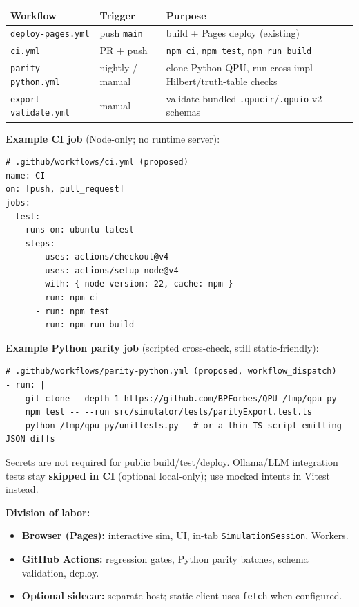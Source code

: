 \documentclass[11pt,a4paper]{article}
\begin{document}
\begin{center}
\begin{tabular}{@{}lll@{}}
\toprule
Workflow & Trigger & Purpose \\
\midrule
\texttt{deploy-pages.yml} & push \texttt{main} & build + Pages deploy (existing) \\
\texttt{ci.yml} & PR + push & \texttt{npm ci}, \texttt{npm test}, \texttt{npm run build} \\
\texttt{parity-python.yml} & nightly / manual & clone Python QPU, run cross-impl Hilbert/truth-table checks \\
\texttt{export-validate.yml} & manual & validate bundled \texttt{.qpucir}/\texttt{.qpuio} v2 schemas \\
\bottomrule
\end{tabular}
\end{center}

\textbf{Example CI job} (Node-only; no runtime server):
\begin{lstlisting}[style=code]
# .github/workflows/ci.yml (proposed)
name: CI
on: [push, pull_request]
jobs:
  test:
    runs-on: ubuntu-latest
    steps:
      - uses: actions/checkout@v4
      - uses: actions/setup-node@v4
        with: { node-version: 22, cache: npm }
      - run: npm ci
      - run: npm test
      - run: npm run build
\end{lstlisting}

\textbf{Example Python parity job} (scripted cross-check, still static-friendly):
\begin{lstlisting}[style=code]
# .github/workflows/parity-python.yml (proposed, workflow_dispatch)
- run: |
    git clone --depth 1 https://github.com/BPForbes/QPU /tmp/qpu-py
    npm test -- --run src/simulator/tests/parityExport.test.ts
    python /tmp/qpu-py/unittests.py   # or a thin TS script emitting JSON diffs
\end{lstlisting}

Secrets are not required for public build/test/deploy. Ollama/LLM integration tests stay \textbf{skipped in CI} (optional local-only); use mocked intents in Vitest instead.

\noindent\textbf{Division of labor:}
\begin{itemize}[noitemsep]
  \item \textbf{Browser (Pages):} interactive sim, UI, in-tab \texttt{SimulationSession}, Workers.
  \item \textbf{GitHub Actions:} regression gates, Python parity batches, schema validation, deploy.
  \item \textbf{Optional sidecar:} separate host; static client uses \texttt{fetch} when configured.
\end{itemize}
\end{document}
